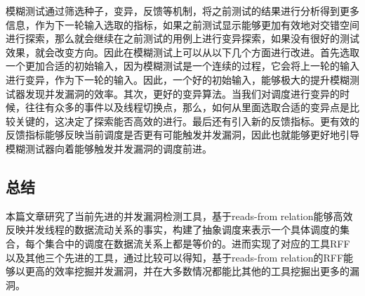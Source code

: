 模糊测试通过筛选种子，变异，反馈等机制，将之前测试的结果进行分析得到更多信息，作为下一轮输入选取的指标，如果之前测试显示能够更加有效地对交错空间进行探索，那么就会继续在之前测试的用例上进行变异探索，如果没有很好的测试效果，就会改变方向。因此在模糊测试上可以从以下几个方面进行改进。首先选取一个更加合适的初始输入，因为模糊测试是一个连续的过程，它会将上一轮的输入进行变异，作为下一轮的输入。因此，一个好的初始输入，能够极大的提升模糊测试器发现并发漏洞的效率。其次，更好的变异算法。当我们对调度进行变异的时候，往往有众多的事件以及线程切换点，那么，如何从里面选取合适的变异点是比较关键的，这决定了探索能否高效的进行。最后还有引入新的反馈指标。更有效的反馈指标能够反映当前调度是否更有可能触发并发漏洞，因此也就能够更好地引导模糊测试器向着能够触发并发漏洞的调度前进。

\subsection{总结}

本篇文章研究了当前先进的并发漏洞检测工具，基于reads-from relation能够高效反映并发线程的数据流动关系的事实，构建了抽象调度来表示一个具体调度的集合，每个集合中的调度在数据流关系上都是等价的。进而实现了对应的工具RFF以及其他三个先进的工具，通过比较可以得知，基于reads-from relation的RFF能够以更高的效率挖掘并发漏洞，并在大多数情况都能比其他的工具挖掘出更多的漏洞。